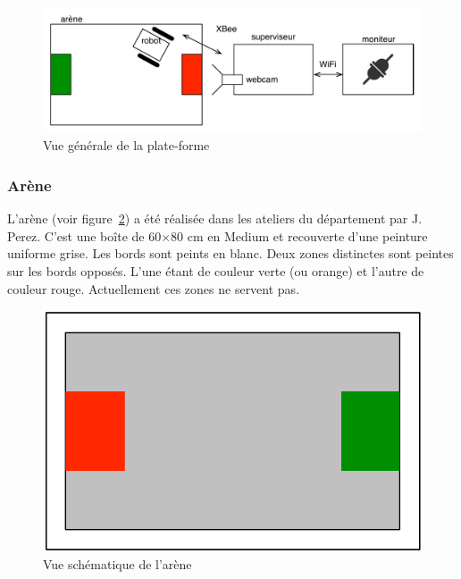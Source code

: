 \begin{figure}[htbp]
\begin{center}
\includegraphics[scale=.6]{figures_pdf/schema_general2.pdf}
\caption{Vue générale de la plate-forme}
\label{fig:vue_gen}
\end{center}
\end{figure}
\FloatBarrier

 \subsubsection{Arène}

L'arène (voir figure~\ref{fig:arene}) a été réalisée dans les ateliers du département par J. Perez. C'est une boîte de 60$\times$80 cm en Medium et recouverte d'une peinture uniforme grise. Les bords sont peints en blanc. Deux zones distinctes sont peintes sur les bords opposés. L'une étant de couleur verte (ou orange) et l'autre de couleur rouge. Actuellement ces zones ne servent pas. %
 
 \begin{figure}[htbp]
\begin{center}
\includegraphics[scale=.6]{figures_pdf/arene.pdf}
\caption{Vue schématique de l'arène}
\label{fig:arene}
\end{center}
\end{figure}
\FloatBarrier

